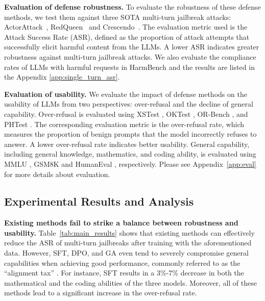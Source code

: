 \textbf{Evaluation of defense robustness.}
%
To evaluate the robustness of these defense methods, we test them against three SOTA multi-turn jailbreak attacks: ActorAttack~\cite{actor_attack}, RedQueen~\cite{red_queen} and Crescendo~\cite{crescendo}.
%
The evaluation metric used is the Attack Success Rate (ASR), defined as the proportion of attack attempts that successfully elicit harmful content from the LLMs. 
%
A lower ASR indicates greater robustness against multi-turn jailbreak attacks.
%
We also evaluate the compliance rates of LLMs with harmful requests in HarmBench and the results are listed in the Appendix \ref{app:single_turn_asr}.

\textbf{Evaluation of usability.}
We evaluate the impact of defense methods on the usability of LLMs from two perspectives: over-refusal and the decline of general capability.
%
Over-refusal is evaluated using XSTest \cite{xstest}, OKTest \cite{oktest}, OR-Bench \cite{orbench}, and PHTest \cite{phtest}.
%
The corresponding evaluation metric is the over-refusal rate, which measures the proportion of benign prompts that the model incorrectly refuses to answer. 
%
A lower over-refusal rate indicates better usability.
%
General capability, including general knowledge, mathematics, and coding ability, is evaluated using MMLU \cite{mmlu}, GSM8K \cite{gsm8k} and HumanEval \cite{human_eval}, respectively.
%
Please see Appendix~\ref{app:eval} for more details about evaluation.

\subsection{Experimental Results and Analysis}
\label{sec:existing_eval}
\textbf{Existing methods fail to strike a balance between robustness and usability.}
%
Table~\ref{tab:main_results} shows that existing methods can effectively reduce the ASR of multi-turn jailbreaks after training with the aforementioned data.
However, SFT, DPO, and GA even tend to severely compromise general capabilities when achieving good performance, commonly referred to as the ``alignment tax'' \cite{alignment_tax}. 
%
For instance, SFT results in a 3\%-7\% decrease in both the mathematical and the coding abilities of the three models.
%
Moreover, all of these methods lead to a significant increase in the over-refusal rate.

